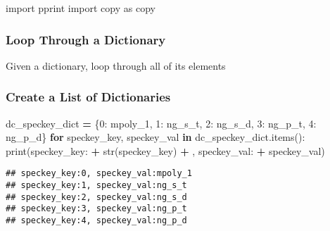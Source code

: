 \documentclass[
]{book}
\newenvironment{Shaded}{\begin{snugshade}}{\end{snugshade}}
\newcommand{\BuiltInTok}[1]{#1}
\newcommand{\ControlFlowTok}[1]{\textcolor[rgb]{0.13,0.29,0.53}{\textbf{#1}}}
\newcommand{\DecValTok}[1]{\textcolor[rgb]{0.00,0.00,0.81}{#1}}
\newcommand{\ImportTok}[1]{#1}
\newcommand{\KeywordTok}[1]{\textcolor[rgb]{0.13,0.29,0.53}{\textbf{#1}}}
\newcommand{\NormalTok}[1]{#1}
\newcommand{\OperatorTok}[1]{\textcolor[rgb]{0.81,0.36,0.00}{\textbf{#1}}}
\newcommand{\StringTok}[1]{\textcolor[rgb]{0.31,0.60,0.02}{#1}}
\begin{document}
\begin{Shaded}
\begin{Highlighting}[]
\ImportTok{import}\NormalTok{ pprint}
\ImportTok{import}\NormalTok{ copy }\ImportTok{as}\NormalTok{ copy}
\end{Highlighting}
\end{Shaded}

\hypertarget{loop-through-a-dictionary}{%
\subsubsection{Loop Through a Dictionary}\label{loop-through-a-dictionary}}

Given a dictionary, loop through all of its elements

\hypertarget{create-a-list-of-dictionaries}{%
\subsubsection{Create a List of Dictionaries}\label{create-a-list-of-dictionaries}}

\begin{Shaded}
\begin{Highlighting}[]
\NormalTok{dc\_speckey\_dict }\OperatorTok{=}\NormalTok{ \{}\DecValTok{0}\NormalTok{: }\StringTok{\textquotesingle{}mpoly\_1\textquotesingle{}}\NormalTok{,}
                   \DecValTok{1}\NormalTok{: }\StringTok{\textquotesingle{}ng\_s\_t\textquotesingle{}}\NormalTok{,}
                   \DecValTok{2}\NormalTok{: }\StringTok{\textquotesingle{}ng\_s\_d\textquotesingle{}}\NormalTok{,}
                   \DecValTok{3}\NormalTok{: }\StringTok{\textquotesingle{}ng\_p\_t\textquotesingle{}}\NormalTok{,}
                   \DecValTok{4}\NormalTok{: }\StringTok{\textquotesingle{}ng\_p\_d\textquotesingle{}}\NormalTok{\}}
\ControlFlowTok{for}\NormalTok{ speckey\_key, speckey\_val }\KeywordTok{in}\NormalTok{ dc\_speckey\_dict.items():}
    \BuiltInTok{print}\NormalTok{(}\StringTok{\textquotesingle{}speckey\_key:\textquotesingle{}} \OperatorTok{+} \BuiltInTok{str}\NormalTok{(speckey\_key) }\OperatorTok{+} \StringTok{\textquotesingle{}, speckey\_val:\textquotesingle{}} \OperatorTok{+}\NormalTok{ speckey\_val)}
\end{Highlighting}
\end{Shaded}

\begin{verbatim}
## speckey_key:0, speckey_val:mpoly_1
## speckey_key:1, speckey_val:ng_s_t
## speckey_key:2, speckey_val:ng_s_d
## speckey_key:3, speckey_val:ng_p_t
## speckey_key:4, speckey_val:ng_p_d
\end{verbatim}
\end{document}
